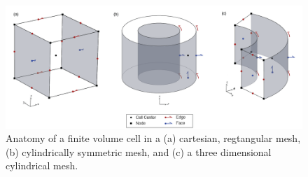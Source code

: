 \begin{figure}
    \begin{center}
    \includegraphics[width=\columnwidth]{figures/finiteVolume-02.png}
    \end{center}
\caption{
    Anatomy of a finite volume cell in a (a) cartesian,
    regtangular mesh, (b) cylindrically symmetric mesh, and
    (c) a three dimensional cylindrical mesh.
}
\label{fig:CylFiniteVolume}
\end{figure}
